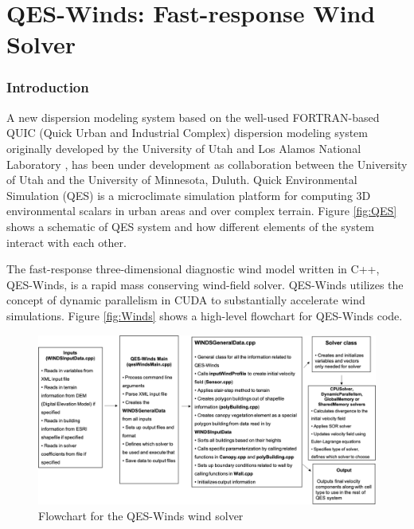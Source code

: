 \part{QES-Winds: Fast-response Wind Solver}

\section{Introduction}

A new dispersion modeling system based on the well-used FORTRAN-based QUIC (Quick Urban and Industrial Complex) dispersion modeling system originally developed by the University of Utah and Los Alamos National Laboratory \cite{brown2013quic}, has been under development as collaboration between the University of Utah and the University of Minnesota, Duluth. Quick Environmental Simulation (QES) is a microclimate simulation platform for computing 3D environmental scalars in urban areas and over complex terrain. Figure \ref{fig:QES} shows a schematic of QES system and how different elements of the system interact with each other.


The fast-response three-dimensional diagnostic wind model written in C++, QES-Winds, is a rapid mass conserving wind-field solver. QES-Winds utilizes the concept of dynamic parallelism in CUDA to substantially accelerate wind simulations. Figure \ref{fig:Winds} shows a high-level flowchart for QES-Winds code.

\begin{figure}[H]
\includegraphics[width=17cm]{Images/QES_flowchart.png}
\caption{Flowchart for the QES-Winds wind solver}
\end{figure}

